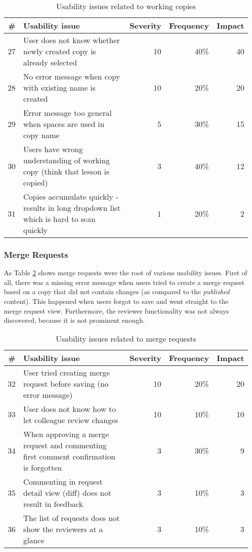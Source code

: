 \begin{table}[h!]
\centering
\begin{tabular}{|r|p{7cm}|r|r|r|}
\hline
\rowcolor[HTML]{EFEFEF}
{\bf \#} & {\bf Usability issue} & {\bf Severity} & {\bf Frequency} & {\bf Impact} \\ \hline
27 & User does not know whether newly created copy is already selected & 10 & 40\% & 40 \\ \hline
28 & No error message when copy with existing name is created & 10 & 20\% & 20 \\ \hline
29 & Error message too general when spaces are used in copy name & 5 & 30\% & 15 \\ \hline
30 & Users have wrong understanding of working copy (think that lesson is copied) & 3 & 40\% & 12 \\ \hline
31 & Copies accumulate quickly - results in long dropdown list which is hard to scan quickly & 1 & 20\% & 2 \\ \hline
\end{tabular}
\caption{Usability issues related to working copies}
\label{table:issues-copies}
\end{table}

\subsubsection{Merge Requests}
As Table \ref{table:issues-merge} shows merge requests were the root of various usability issues. First of all, there was a missing error message when users tried to create a merge request based on a copy that did not contain changes (as compared to the \textit{published} content). This happened when users forgot to save and went straight to the merge request view. Furthermore, the reviewer functionality was not always discovered, because it is not prominent enough.

\begin{table}[h!]
\centering
\begin{tabular}{|r|p{7cm}|r|r|r|}
\hline
\rowcolor[HTML]{EFEFEF}
{\bf \#} & {\bf Usability issue} & {\bf Severity} & {\bf Frequency} & {\bf Impact} \\ \hline
32 & User tried creating merge request before saving (no error message) & 10 & 20\% & 20 \\ \hline
33 & User does not know how to let colleague review changes & 10 & 10\% & 10 \\ \hline
34 & When approving a merge request and commenting first comment confirmation is forgotten & 3 & 30\% & 9 \\ \hline
35 & Commenting in request detail view (diff) does not result in feedback & 3 & 10\% & 3 \\ \hline
36 & The list of requests does not show the reviewers at a glance & 3 & 10\% & 3 \\ \hline
\end{tabular}
\caption{Usability issues related to merge requests}
\label{table:issues-merge}
\end{table}

